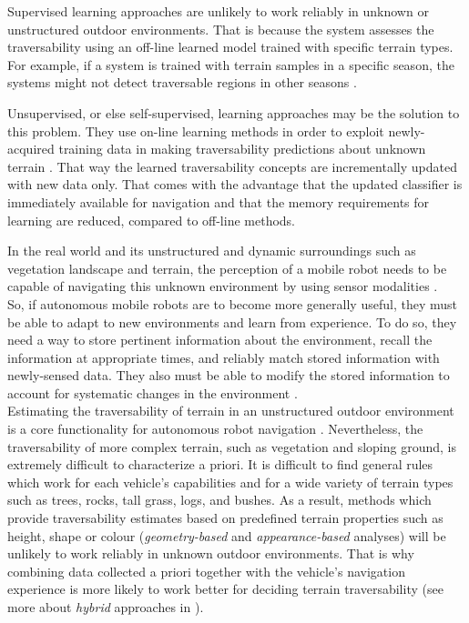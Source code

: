 \documentclass[12pt,a4paper]{report}
\newcommand{\term}{\textit}
\begin{document}
	Supervised learning approaches are unlikely to work reliably in unknown or 
	unstructured outdoor environments. That is because the system assesses the 
	traversability using an off-line learned model trained with specific 
	terrain types. For example, if a system is trained with terrain samples in a 
	specific season, the systems might not detect traversable regions in other 
	seasons \citep{Lee}.
	\par
	Unsupervised, or else self-supervised, learning approaches may be the solution 
	to this problem. They use on-line learning methods in order to exploit newly-
	acquired training data in making traversability predictions about unknown 
	terrain \citep{Kim}. That way the learned traversability concepts are 
	incrementally updated with new data only. That comes with the advantage that the 
	updated classifier is immediately available for navigation and that the memory 
	requirements for learning are reduced, compared to off-line methods.
	\par
	In the real world and its unstructured and dynamic surroundings such as vegetation 
	landscape and terrain, the perception of a mobile robot needs to be capable of 
	navigating this unknown environment by using sensor modalities \citep{Shabbir}.
	\\
	
	So, if autonomous mobile robots are to become more generally useful, they must 
	be able to adapt to new environments and learn from experience. To do so, they 
	need a way to store pertinent information about the environment, recall the 
	information at appropriate times, and reliably match stored information with 
	newly-sensed data. They also must be able to modify the stored information to 
	account for systematic changes in the environment \citep{Shneier}.
	\\
	
	Estimating the traversability of terrain in an unstructured outdoor 
	environment is a core functionality for autonomous robot navigation \citep{Kim}. 
	Nevertheless, the traversability of more complex terrain, such as 
	vegetation and sloping ground, is extremely difficult to characterize a priori. 
	It is difficult to find general rules which work for each vehicle's	capabilities
	and for a wide variety of terrain types such as trees, rocks, tall grass, logs, 
	and bushes. As a result, methods which provide traversability estimates 
	based on predefined terrain properties such as height, shape or colour 
	(\term{geometry-based} and \term{appearance-based} analyses) will be unlikely to 
	work reliably in unknown outdoor environments. That is why combining data 
	collected a priori together with the vehicle’s navigation experience is more 
	likely to work better for deciding terrain traversability (see more about 
	\term{hybrid} approaches in \citet{Papadakis}).
	\\
	
\end{document}
